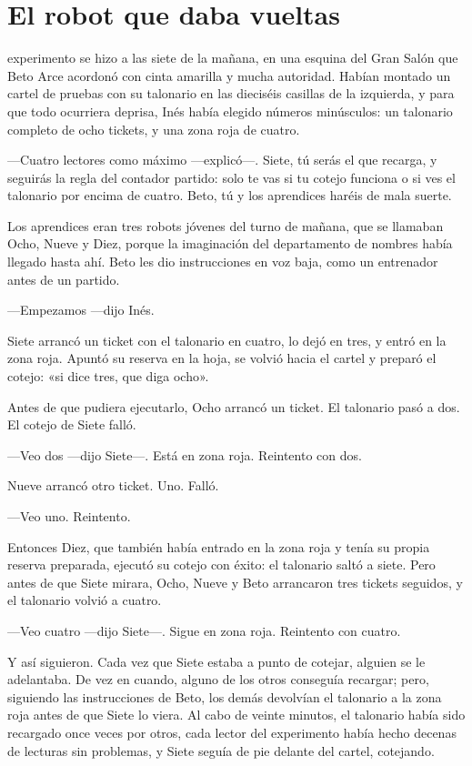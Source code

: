 \chapter{El robot que daba vueltas}

 experimento se hizo a las siete de la mañana, en una esquina del Gran Salón que Beto Arce acordonó con cinta amarilla y mucha autoridad. Habían montado un cartel de pruebas con su talonario en las dieciséis casillas de la izquierda, y para que todo ocurriera deprisa, Inés había elegido números minúsculos: un talonario completo de ocho tickets, y una zona roja de cuatro.

---Cuatro lectores como máximo ---explicó---\nobreak. Siete, tú serás el que recarga, y seguirás la regla del contador partido: solo te vas si tu cotejo funciona o si ves el talonario por encima de cuatro. Beto, tú y los aprendices haréis de mala suerte.

Los aprendices eran tres robots jóvenes del turno de mañana, que se llamaban Ocho, Nueve y Diez, porque la imaginación del departamento de nombres había llegado hasta ahí. Beto les dio instrucciones en voz baja, como un entrenador antes de un partido.

---Empezamos ---dijo Inés.

Siete arrancó un ticket con el talonario en cuatro, lo dejó en tres, y entró en la zona roja. Apuntó su reserva en la hoja, se volvió hacia el cartel y preparó el cotejo: «si dice tres, que diga ocho».

Antes de que pudiera ejecutarlo, Ocho arrancó un ticket. El talonario pasó a dos. El cotejo de Siete falló.

---Veo dos ---dijo Siete---\nobreak. Está en zona roja. Reintento con dos.

Nueve arrancó otro ticket. Uno. Falló.

---Veo uno. Reintento.

Entonces Diez, que también había entrado en la zona roja y tenía su propia reserva preparada, ejecutó su cotejo con éxito: el talonario saltó a siete. Pero antes de que Siete mirara, Ocho, Nueve y Beto arrancaron tres tickets seguidos, y el talonario volvió a cuatro.

---Veo cuatro ---dijo Siete---\nobreak. Sigue en zona roja. Reintento con cuatro.

Y así siguieron. Cada vez que Siete estaba a punto de cotejar, alguien se le adelantaba. De vez en cuando, alguno de los otros conseguía recargar; pero, siguiendo las instrucciones de Beto, los demás devolvían el talonario a la zona roja antes de que Siete lo viera. Al cabo de veinte minutos, el talonario había sido recargado once veces por otros, cada lector del experimento había hecho decenas de lecturas sin problemas, y Siete seguía de pie delante del cartel, cotejando.

